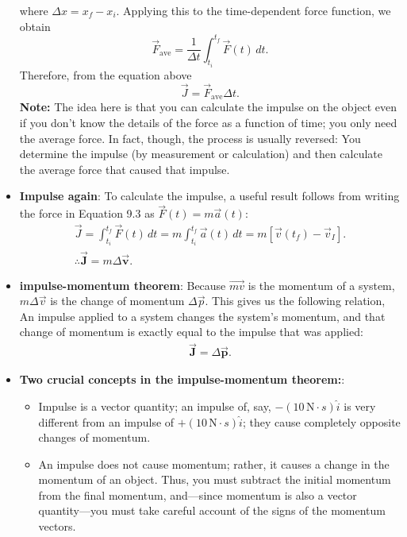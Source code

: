 \documentclass{report}
\begin{document}
\begin{itemize}
\[            \]
            where $\Delta x = x_f - x_i$. Applying this to the time-dependent force function, we obtain
            \[
                \vec{F}_{\text{ave}} = \frac{1}{\Delta t} \int_{t_i}^{t_f} \vec{F}(t) \, dt.
            \]
            Therefore, from the equation above
            \[
                \vec{J} = \vec{F}_{\text{ave}} \Delta t.
            \]
            \bigbreak \noindent 
            \textbf{Note:} The idea here is that you can calculate the impulse on the object even if you don’t know the details of the force as a function of time; you only need the average force. In fact, though, the process is usually reversed: You determine the impulse (by measurement or calculation) and then calculate the average force that caused that impulse.
        \item \textbf{Impulse again}:
            To calculate the impulse, a useful result follows from writing the force in Equation 9.3 as $\vec{F}(t) = m\vec{a}(t)$:
            \begin{align*}
                \vec{J} = \int_{t_i}^{t_f} \vec{F}(t) \, dt = m\int_{t_i}^{t_f} \vec{a}(t) \, dt = m[\vec{v}(t_f) - \vec{v}_I]. \\
                \therefore \vec{\mathbf{J}} = m\Delta\vec{\mathbf{v}}
            .\end{align*}
        \item \textbf{impulse-momentum theorem}:
            Because $\vec{mv}$ is the momentum of a system, $m\Delta\vec{v}$ is the change of momentum $\Delta\vec{p}$. This gives us the following relation,
            \bigbreak \noindent 
            An impulse applied to a system changes the system’s momentum, and that change of momentum is exactly equal to the impulse that was applied:
            \begin{align*}
                \vec{\mathbf{J}} = \Delta \vec{\mathbf{p}}
            .\end{align*}
        \item \textbf{Two crucial concepts in the impulse-momentum theorem:}:
            \begin{itemize}
                \item Impulse is a vector quantity; an impulse of, say, $-(10\, \text{N} \cdot s) \hat{i}$ is very different from an impulse of $+(10\, \text{N} \cdot s) \hat{i}$; they cause completely opposite changes of momentum.
                \item An impulse does not cause momentum; rather, it causes a change in the momentum of an object. Thus, you must subtract the initial momentum from the final momentum, and---since momentum is also a vector quantity---you must take careful account of the signs of the momentum vectors.

\end{itemize}
\end{itemize}
\end{document}
